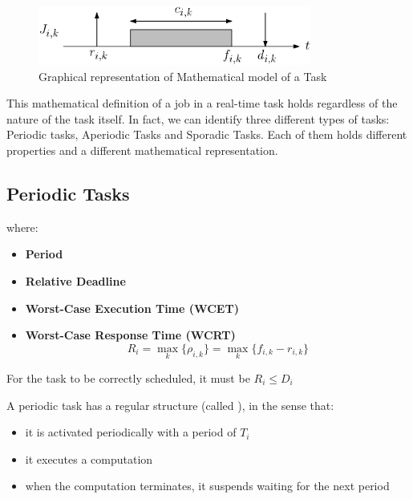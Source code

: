 \begin{figure}[!ht]
    \centering
    \includegraphics[width = 0.8\textwidth]{images/image01.png}
    \caption{Graphical representation of Mathematical model of a Task}
    \label{fig:image01}
\end{figure}

This mathematical definition of a job in a real-time task holds regardless of the nature of the task itself. In fact, we can identify three different types of tasks: Periodic tasks, Aperiodic Tasks and Sporadic Tasks.
Each of them holds different properties and a different mathematical representation.

\subsection{Periodic Tasks}

where:
\begin{itemize}
    \item{\textbf{Period}}
    \item{\textbf{Relative Deadline}}
    \item{\textbf{Worst-Case Execution Time (WCET)}}
    \item{\textbf{Worst-Case Response Time (WCRT)}}
    \[R_i = \max_k \{\rho_{i,k}\}=\max_k \{f_{i,k} - r_{i,k}\}\]
\end{itemize}
For the task to be correctly scheduled, it must be $R_i \le D_i$

A periodic task has a regular structure (called ), in the sense that:
\begin{itemize}
\item it is activated periodically with a period of $T_i$
\item it executes a computation
\item when the computation terminates, it suspends waiting for the next period
\end{itemize}

